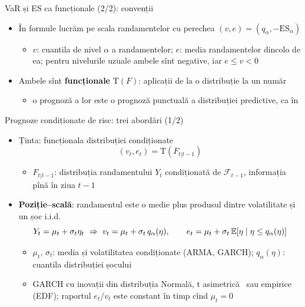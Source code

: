 \begin{frame}{VaR și ES ca funcționale (2/2): convenții}
\itemsize{\small}
\begin{itemize}
    \item În formule lucrăm pe scala randamentelor cu perechea $(v, e) = (q_\alpha, -\mathrm{ES}_\alpha)$
    \begin{itemize}
        \item $v$: cuantila de nivel $\alpha$ a randamentelor; $e$: media randamentelor dincolo de ea; pentru nivelurile uzuale ambele sînt negative, iar $e \le v < 0$
    \end{itemize}
    \item Ambele sînt \textbf{funcționale} $\mathrm T(F)$: aplicații de la o distribuție la un număr
    \begin{itemize}
        \item o prognoză a lor este o prognoză punctuală a distribuției predictive, ca în 
    \end{itemize}
\end{itemize}
\end{frame}

\begin{frame}{Prognoze condiționate de risc: trei abordări (1/2)}
\itemsize{\small}
\begin{itemize}
    \item Ținta: funcționala distribuției condiționate
    \[ (v_t, e_t) = \mathrm T(F_{t|t-1}) \]
    \begin{itemize}
        \item $F_{t|t-1}$: distribuția randamentului $Y_t$ condiționată de $\mathcal F_{t-1}$, informația pînă în ziua $t-1$
    \end{itemize}
    \item \textbf{Poziție--scală}: randamentul este o medie plus produsul dintre volatilitate și un șoc i.i.d.
    \[ Y_t = \mu_t + \sigma_t\eta_t \ \Rightarrow\ v_t = \mu_t + \sigma_t\,q_\alpha(\eta), \qquad e_t = \mu_t + \sigma_t\,\mathbb{E}[\eta \mid \eta \le q_\alpha(\eta)] \]
    \begin{itemize}
        \item $\mu_t$, $\sigma_t$: media și volatilitatea condiționate (ARMA, GARCH); $q_\alpha(\eta)$: cuantila distribuției șocului
        \item GARCH cu inovații din distribuția Normală, t asimetrică \ sau empirice (EDF); raportul $e_t/v_t$ este constant în timp cînd $\mu_t = 0$
    \end{itemize}
\end{itemize}
\end{frame}

